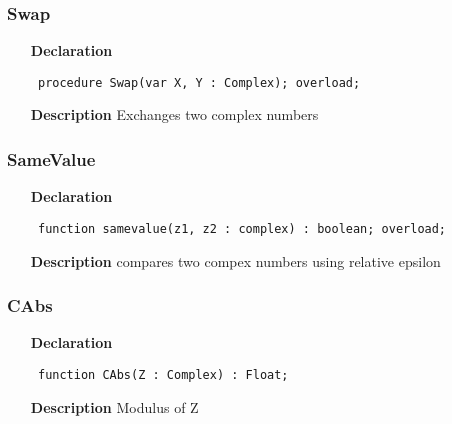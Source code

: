 \documentclass[12pt,a4paper,oneside]{report}
\newcommand{\declarationitem}[1]{\textbf{#1}}
\newcommand{\descriptiontitle}[1]{\textbf{#1}}
\newcommand{\code}[1]{\texttt{#1}}
\begin{document}
\subsubsection{Swap}
\label{ucomplex-Swap}
\begin{itemize}\item[\declarationitem{Declaration}\hfill]
\begin{flushleft}
\code{
procedure Swap(var X, Y : Complex); overload;}

\end{flushleft}

\par
\item[\descriptiontitle{Description}]
Exchanges two complex numbers

\end{itemize}
\subsubsection{SameValue}
\label{ucomplex-samevalue}
\begin{itemize}\item[\declarationitem{Declaration}\hfill]
\begin{flushleft}
\code{
function samevalue(z1, z2 : complex) : boolean; overload;}

\end{flushleft}

\par
\item[\descriptiontitle{Description}]
compares two compex numbers using relative epsilon

\end{itemize}
\subsubsection{CAbs}
\label{ucomplex-CAbs}
\begin{itemize}\item[\declarationitem{Declaration}\hfill]
\begin{flushleft}
\code{
function CAbs(Z : Complex) : Float;}

\end{flushleft}

\par
\item[\descriptiontitle{Description}]
Modulus of Z

\end{itemize}
\end{document}
